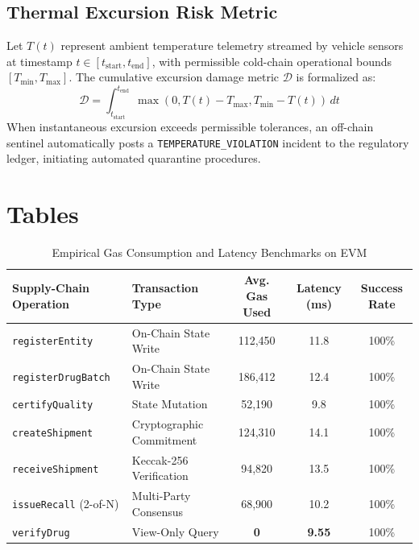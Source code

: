 \documentclass[11pt,a4paper]{article}
\begin{document}
\subsection{Thermal Excursion Risk Metric}
Let $T(t)$ represent ambient temperature telemetry streamed by vehicle sensors at timestamp $t \in [t_{\text{start}}, t_{\text{end}}]$, with permissible cold-chain operational bounds $[T_{\min}, T_{\max}]$. The cumulative excursion damage metric $\mathcal{D}$ is formalized as:
\begin{equation}
\mathcal{D} = \int_{t_{\text{start}}}^{t_{\text{end}}} \max\left(0, T(t) - T_{\max}, T_{\min} - T(t)\right) \, dt
\label{eq:thermal}
\end{equation}
When instantaneous excursion exceeds permissible tolerances, an off-chain sentinel automatically posts a \texttt{TEMPERATURE\_VIOLATION} incident to the regulatory ledger, initiating automated quarantine procedures.

\section{Tables}

\begin{table}[htbp]
\centering
\caption{Empirical Gas Consumption and Latency Benchmarks on EVM}
\label{tab:benchmarks}
\vspace{0.5em}
\begin{tabular}{llccc}
\toprule
\textbf{Supply-Chain Operation} & \textbf{Transaction Type} & \textbf{Avg. Gas Used} & \textbf{Latency (ms)} & \textbf{Success Rate} \\
\midrule
\texttt{registerEntity} & On-Chain State Write & 112,450 & 11.8 & 100\% \\
\texttt{registerDrugBatch} & On-Chain State Write & 186,412 & 12.4 & 100\% \\
\texttt{certifyQuality} & State Mutation & 52,190 & 9.8 & 100\% \\
\texttt{createShipment} & Cryptographic Commitment & 124,310 & 14.1 & 100\% \\
\texttt{receiveShipment} & Keccak-256 Verification & 94,820 & 13.5 & 100\% \\
\texttt{issueRecall} (2-of-N) & Multi-Party Consensus & 68,900 & 10.2 & 100\% \\
\texttt{verifyDrug} & View-Only Query & \textbf{0} & \textbf{9.55} & 100\% \\
\bottomrule
\end{tabular}
\end{table}
\end{document}
